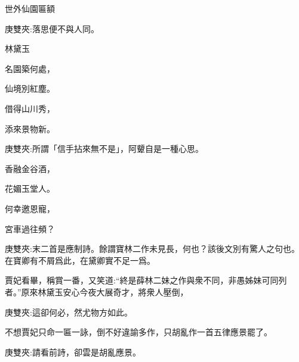 \begin{poem}
    \begin{pl}世外仙園匾額\end{pl}
    \begin{note}庚雙夾:落思便不與人同。\end{note}\begin{pl}林黛玉\end{pl}

    \begin{pl}名園築何處，\end{pl}

    \begin{pl}仙境別紅塵。\end{pl}

    \begin{pl}借得山川秀，\end{pl}

    \begin{pl}添來景物新。\end{pl}
    \begin{note}庚雙夾:所謂「信手拈來無不是」，阿顰自是一種心思。\end{note}

    \begin{pl}香融金谷酒，\end{pl}

    \begin{pl}花媚玉堂人。\end{pl}

    \begin{pl}何幸邀恩寵，\end{pl}

    \begin{pl}宮車過往頻？\end{pl}
    \begin{note}庚雙夾:末二首是應制詩。餘謂寶林二作未見長，何也？該後文別有驚人之句也。在寶卿有不屑爲此，在黛卿實不足一爲。\end{note}

\end{poem}


\begin{parag}
    賈妃看畢，稱賞一番，又笑道:“終是薛林二妹之作與衆不同，非愚姊妹可同列者。”原來林黛玉安心今夜大展奇才，將衆人壓倒，\begin{note}庚雙夾:這卻何必，然尤物方如此。\end{note}不想賈妃只命一匾一詠，倒不好違諭多作，只胡亂作一首五律應景罷了。\begin{note}庚雙夾:請看前詩，卻雲是胡亂應景。\end{note}
\end{parag}


